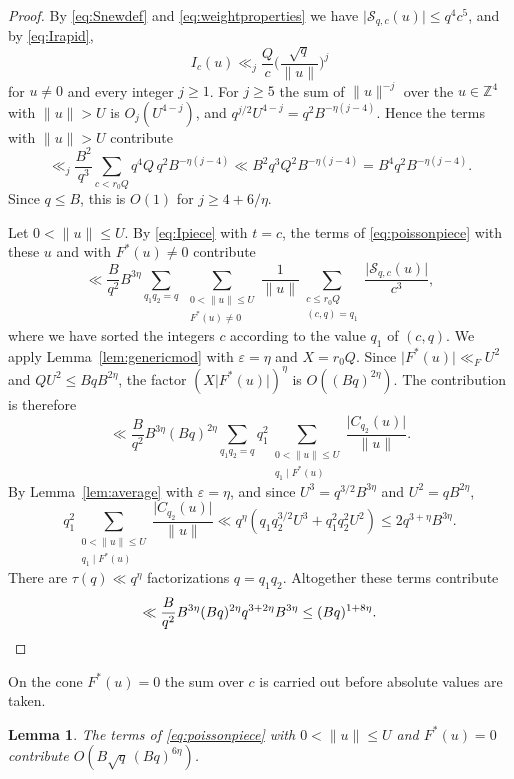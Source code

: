 \documentclass[11pt]{amsart}
\numberwithin{equation}{section}
\numberwithin{figure}{section}
\newtheorem{lemma}{Lemma}[section]
\theoremstyle{definition}
\newcommand{\Z}{\mathbb{Z}}
\newcommand{\F}{\mathcal{F}}
\newcommand{\eps}{\varepsilon}
\newcommand{\abs}[1]{\lvert #1\rvert}
\begin{document}
\begin{proof}
By \eqref{eq:Snewdef} and \eqref{eq:weightproperties} we have
$\abs{\mathcal S_{q,c}(u)}\le q^4c^5$, and by \eqref{eq:Irapid},
\[
 I_c(u)\ll_j\frac Qc\bigg(\frac{\sqrt q}{\lVert u\rVert}\bigg)^j
\]
for $u\ne0$ and every integer $j\ge1$. For $j\ge5$ the sum of
$\lVert u\rVert^{-j}$ over the $u\in\Z^4$ with $\lVert u\rVert>U$ is
$O_j(U^{4-j})$, and $q^{j/2}U^{4-j}=q^2B^{-\eta(j-4)}$. Hence the
terms with $\lVert u\rVert>U$ contribute
\[
 \ll_j\frac{B^2}{q^3}\sum_{c<r_0Q}q^4Q\,q^2B^{-\eta(j-4)}
 \ll B^2q^3Q^2B^{-\eta(j-4)}=B^4q^2B^{-\eta(j-4)}.
\]
Since $q\le B$, this is $O(1)$ for $j\ge4+6/\eta$.

Let $0<\lVert u\rVert\le U$. By \eqref{eq:Ipiece} with $t=c$, the
terms of \eqref{eq:poissonpiece} with these $u$ and with
$F^*(u)\ne0$ contribute
\[
 \ll\frac B{q^2}B^{3\eta}\sum_{q_1q_2=q}\
 \sum_{\substack{0<\lVert u\rVert\le U\\F^*(u)\ne0}}\frac1{\lVert u\rVert}
 \sum_{\substack{c\le r_0Q\\(c,q)=q_1}}\frac{\abs{\mathcal S_{q,c}(u)}}{c^3},
\]
where we have sorted the integers $c$ according to the value $q_1$
of $(c,q)$. We apply Lemma~\ref{lem:genericmod} with $\eps=\eta$ and
$X=r_0Q$. Since $\abs{F^*(u)}\ll_FU^2$ and
$QU^2\le BqB^{2\eta}$, the factor $(X\abs{F^*(u)})^\eta$ is
$O((Bq)^{2\eta})$. The contribution is therefore
\[
 \ll\frac B{q^2}B^{3\eta}(Bq)^{2\eta}\sum_{q_1q_2=q}q_1^2
 \sum_{\substack{0<\lVert u\rVert\le U\\q_1\mid F^*(u)}}
 \frac{\abs{C_{q_2}(u)}}{\lVert u\rVert}.
\]
By Lemma~\ref{lem:average} with $\eps=\eta$, and since
$U^3=q^{3/2}B^{3\eta}$ and $U^2=qB^{2\eta}$,
\[
 q_1^2\sum_{\substack{0<\lVert u\rVert\le U\\q_1\mid F^*(u)}}
 \frac{\abs{C_{q_2}(u)}}{\lVert u\rVert}
 \ll q^\eta(q_1q_2^{3/2}U^3+q_1^2q_2^2U^2)
 \le2q^{3+\eta}B^{3\eta}.
\]
There are $\tau(q)\ll q^\eta$ factorizations $q=q_1q_2$. Altogether
these terms contribute
\[
 \ll\frac B{q^2}B^{3\eta}(Bq)^{2\eta}q^{3+2\eta}B^{3\eta}
 \le(Bq)^{1+8\eta}.\qedhere
\]
\end{proof}

On the cone $F^*(u)=0$ the sum over $c$ is carried out before
absolute values are taken.

\begin{lemma}\label{lem:oncone}
The terms of \eqref{eq:poissonpiece} with $0<\lVert u\rVert\le U$
and $F^*(u)=0$ contribute $O(B\sqrt q\,(Bq)^{6\eta})$.
\end{lemma}
\end{document}
